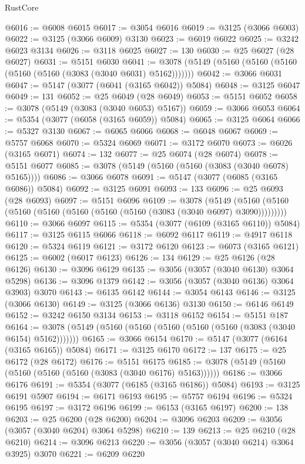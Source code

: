 \begin{lexlean}{RustCore}
\begin{coremodule}
@6016 := @6008 @6015
@6017 := @3054 @6016
@6019 := @3125 (@3066 @6003)
@6022 := @3125 (@3066 @6009) @3130
@6023 := @6019 @6022
@6025 := @3242 @6023 @3134
@6026 := @3118 @6025
@6027 := 130
@6030 := @25 @6027 (@28 @6027)
@6031 := @5151 @6030
@6041 := @3078 (@5149 (@5160 (@5160 (@5160 (@5160 (@5160 (@3083 (@3040 @6031) @5162)))))))
@6042 := @3066 @6031
@6047 := @5147 (@3077 (@6041 (@3165 @6042)) @5084)
@6048 := @3125 @6047
@6049 := 131
@6052 := @25 @6049 (@28 @6049)
@6053 := @5151 @6052
@6058 := @3078 (@5149 (@3083 (@3040 @6053) @5167))
@6059 := @3066 @6053
@6064 := @5354 (@3077 (@6058 (@3165 @6059)) @5084)
@6065 := @3125 @6064
@6066 := @5327 @3130
@6067 := @6065 @6066
@6068 := @6048 @6067
@6069 := @5757 @6068
@6070 := @5324 @6069
@6071 := @3172 @6070
@6073 := @6026 (@3165 @6071)
@6074 := 132
@6077 := @25 @6074 (@28 @6074)
@6078 := @5151 @6077
@6085 := @3078 (@5149 (@5160 (@5160 (@3083 (@3040 @6078) @5165))))
@6086 := @3066 @6078
@6091 := @5147 (@3077 (@6085 (@3165 @6086)) @5084)
@6092 := @3125 @6091
@6093 := 133
@6096 := @25 @6093 (@28 @6093)
@6097 := @5151 @6096
@6109 := @3078
    (@5149 (@5160 (@5160 (@5160 (@5160 (@5160 (@5160 (@5160 (@3083 (@3040 @6097) @3090)))))))))
@6110 := @3066 @6097
@6115 := @5354 (@3077 (@6109 (@3165 @6110)) @5084)
@6117 := @3125 @6115 @6066
@6118 := @6092 @6117
@6119 := @4917 @6118
@6120 := @5324 @6119
@6121 := @3172 @6120
@6123 := @6073 (@3165 @6121)
@6125 := @6002 (@6017 @6123)
@6126 := 134
@6129 := @25 @6126 (@28 @6126)
@6130 := @3096 @6129
@6135 := @3056 (@3057 (@3040 @6130) @3064 @5298)
@6136 := @3096 @1379
@6142 := @3056 (@3057 (@3040 @6136) @3064 @3903) @3070
@6143 := @6135 @6142
@6144 := @3054 @6143
@6146 := @3125 (@3066 @6130)
@6149 := @3125 (@3066 @6136) @3130
@6150 := @6146 @6149
@6152 := @3242 @6150 @3134
@6153 := @3118 @6152
@6154 := @5151 @187
@6164 := @3078 (@5149 (@5160 (@5160 (@5160 (@5160 (@5160 (@3083 (@3040 @6154) @5162)))))))
@6165 := @3066 @6154
@6170 := @5147 (@3077 (@6164 (@3165 @6165)) @5084)
@6171 := @3125 @6170
@6172 := 137
@6175 := @25 @6172 (@28 @6172)
@6176 := @5151 @6175
@6185 := @3078 (@5149 (@5160 (@5160 (@5160 (@5160 (@3083 (@3040 @6176) @5163))))))
@6186 := @3066 @6176
@6191 := @5354 (@3077 (@6185 (@3165 @6186)) @5084)
@6193 := @3125 @6191 @5907
@6194 := @6171 @6193
@6195 := @5757 @6194
@6196 := @5324 @6195
@6197 := @3172 @6196
@6199 := @6153 (@3165 @6197)
@6200 := 138
@6203 := @25 @6200 (@28 @6200)
@6204 := @3096 @6203
@6209 := @3056 (@3057 (@3040 @6204) @3064 @5298)
@6210 := 139
@6213 := @25 @6210 (@28 @6210)
@6214 := @3096 @6213
@6220 := @3056 (@3057 (@3040 @6214) @3064 @3925) @3070
@6221 := @6209 @6220

\end{coremodule}
\end{lexlean}
